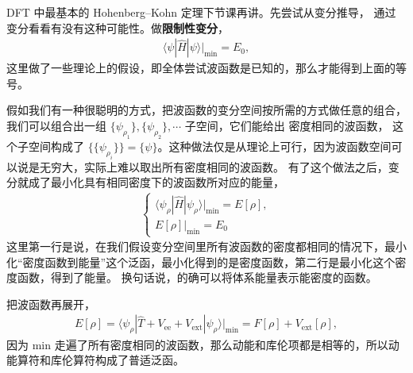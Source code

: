 DFT 中最基本的 Hohenberg--Kohn 定理下节课再讲。先尝试从变分推导，
通过变分看看有没有这种可能性。做\textbf{限制性变分}，
\begin{align}
    \langle \psi | \hat H | \psi \rangle |_{\text{min}} = E_0,
\end{align}
这里做了一些理论上的假设，即全体尝试波函数是已知的，那么才能得到上面的等号。

假如我们有一种很聪明的方式，把波函数的变分空间按所需的方式做任意的组合，我们可以组合出一组 $\{\psi_{\rho_1}\}, \{\psi_{\rho_2}\}, \cdots$ 子空间，它们能给出
密度相同的波函数，
这个子空间构成了 $\big\{\{\psi_{\rho_i}\}\big\} = \{\psi\}$。这种做法仅是从理论上可行，因为波函数空间可以说是无穷大，实际上难以取出所有密度相同的波函数。
有了这个做法之后，变分就成了最小化具有相同密度下的波函数所对应的能量，
\begin{align}
\left\{
\begin{array}{l}
\langle \psi_\rho | \hat H |\psi_\rho \rangle|_\text{min} = E[\rho], \\
E[\rho] | _{\text{min}} = E_0
\end{array}
\right.
\end{align}
这里第一行是说，在我们假设变分空间里所有波函数的密度都相同的情况下，最小化``密度函数到能量''这个泛函，最小化得到的是密度函数，第二行是最小化这个密度函数，得到了能量。
换句话说，的确可以将体系能量表示能密度的函数。


把波函数再展开，
\begin{align}
    E[\rho] = 
\langle    \psi_\rho | \hat T + V_{\mathrm{ee}} + V_{\mathrm{ext}} | \psi_\rho \rangle | _{\text{min}}  
= F[\rho] + V_{\mathrm{ext}}[\rho], 
\end{align}
因为 min 走遍了所有密度相同的波函数，那么动能和库伦项都是相等的，所以动能算符和库伦算符构成了普适泛函。
